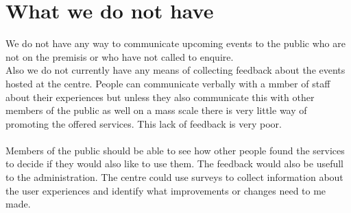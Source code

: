\documentclass{article}
\begin{document}
\section{What we do not have}
We do not have any way to communicate upcoming events to the public who are not on the premisis or who have not called to enquire.
\\Also we do not currently have any means of collecting feedback about the events hosted at the centre.  People can communicate verbally with a mmber of staff about their experiences but unless they also communicate this with other members of the public as well on a mass scale there is very little way of promoting the offered services.  This lack of feedback is very poor.
\\\\Members of the public should be able to see how other people found the services to decide if they would also like to use them.  The feedback would also be usefull to the administration.  The centre could use surveys to collect information about the user experiences and identify what improvements or changes need to me made.

\end{document}
